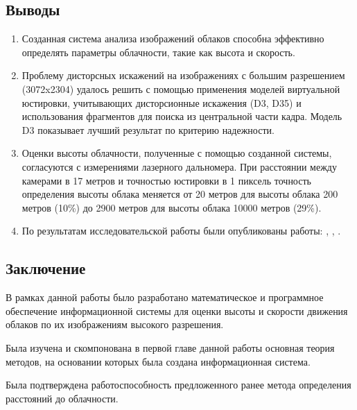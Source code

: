 \newpage
\begin{center}
  \section*{Выводы}
\end{center}

\begin{enumerate}
  \item Созданная система анализа изображений облаков способна эффективно определять
  параметры облачности, такие как высота и скорость.
  \item Проблему дисторсных искажений на изображениях с большим разрешением (3072x2304)
  удалось решить с помощью применения моделей  виртуальной юстировки, учитывающих
  дисторсионные искажения (D3, D35) и использования фрагментов для поиска из центральной
  части кадра. Модель D3 показывает лучший результат по критерию надежности.
  \item Оценки высоты облачности, полученные с помощью созданной системы, согласуются с
  измерениями лазерного дальномера. При расстоянии между камерами в 17 метров и
  точностью юстировки в 1 пиксель точность определения высоты облака меняется
  от 20 метров для высоты облака 200 метров (10\%) до 2900 метров для высоты облака 10000 метров (29\%).
  \item По результатам исследовательской работы были опубликованы работы:
  \cite{art:spie_2017}, \cite{art:spie_2016}, \cite{art:atm_optics_2016}.

\end{enumerate}



\newpage
\begin{center}
  \section*{Заключение}
\end{center}

В рамках данной работы было разработано математическое и программное обеспечение
информационной системы для оценки высоты и скорости движения облаков по их
изображениям высокого разрешения.

Была изучена и скомпонована в первой главе данной работы основная теория методов, на основании
которых была создана информационная система.

Была подтверждена работоспособность предложенного ранее метода определения расстояний
до облачности.

